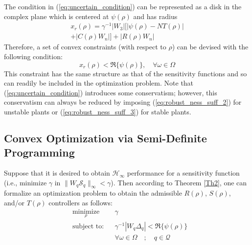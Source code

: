 \documentclass[journal]{IEEEtran}
\begin{document}
The condition in (\ref{eq:uncertain_condition}) can be represented as a disk in the complex plane which is centered at $\psi(\rho)$ and has radius
\begin{equation} \label{eq:rad_robust_design}
\begin{aligned} 
x_r (\rho) = \gamma^{-1}|W_3| \bigl[|\psi(\rho)-NT(\rho)|  \\ + |C(\rho)W_n | \bigr] +  |R(\rho)W_n| 
\end{aligned}
\end{equation}
Therefore, a set of convex constraints (with respect to $\rho$) can be devised with the following condition:
\begin{equation}
x_r(\rho) < \Re \{ \psi(\rho)\}, \quad \forall \omega \in \Omega
\end{equation}
This constraint has the same structure as that of the sensitivity functions and so can readily be included in the optimization problem. Note that (\ref{eq:uncertain_condition}) introduces some conservatism; however, this conservatism can always be reduced by imposing (\ref{eq:robust_ness_suff_2}) for unstable plants or (\ref{eq:robust_ness_suff_3}) for stable plants. 





\subsection{Convex Optimization via Semi-Definite Programming}
Suppose that it is desired to obtain $\mathcal{H}_{\infty}$ performance for a sensitivity function (i.e., minimize $\gamma$ in $\|W_q\mathcal{S}_q \|_{\infty}<\gamma$). Then according to Theorem \ref{Th2}, one can formalize an optimization problem to obtain the admissible $R(\rho)$, $S(\rho)$, and/or $T(\rho)$ controllers as follows:
\begin{equation} \label{eq:min2}
\begin{aligned}
& \underset{ \rho}{\text{minimize}}
& & \gamma  \\
& \text{subject to:} & & \gamma^{-1} |W_q \Delta_q| < \Re\{\psi(\rho) \}  \\ 
& & & \forall \omega \in \Omega \quad ; \quad  q \in \mathcal{Q}
\end{aligned}
\end{equation}
\end{document}
